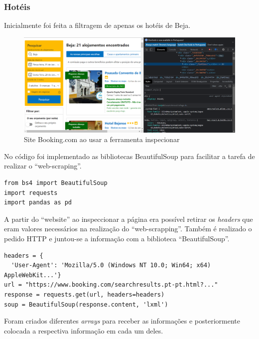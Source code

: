 \documentclass[a4paper,10pt]{article}
\begin{document}
\subsubsection{Hotéis}

Inicialmente foi feita a filtragem de apenas os hotéis de Beja.

\begin{figure}[!htb]
  \centering
  \includegraphics[width=15cm]{booking_com.png}
  \caption{Site Booking.com ao usar a ferramenta inspecionar}
  \label{fig:booking_com}
\end{figure}

\newpage

No código foi implementado as bibliotecas BeautifulSoup para facilitar a tarefa de realizar o ``web-scraping''.

\begin{verbatim}
from bs4 import BeautifulSoup
import requests
import pandas as pd
\end{verbatim}

A partir do ``website'' ao inspeccionar a página era possível retirar os \textit{headers} que eram valores necessários na realização do ``web-scrapping''.
Também é realizado o pedido HTTP e juntou-se a informação com a biblioteca ``BeautifulSoup''.

\begin{verbatim}
headers = {
  'User-Agent': 'Mozilla/5.0 (Windows NT 10.0; Win64; x64) AppleWebKit...'}
url = "https://www.booking.com/searchresults.pt-pt.html?..."
response = requests.get(url, headers=headers)
soup = BeautifulSoup(response.content, 'lxml')
\end{verbatim}

Foram criados diferentes \textit{arrays} para receber as informações e posteriormente colocada a respectiva informação em cada um deles.
\end{document}
